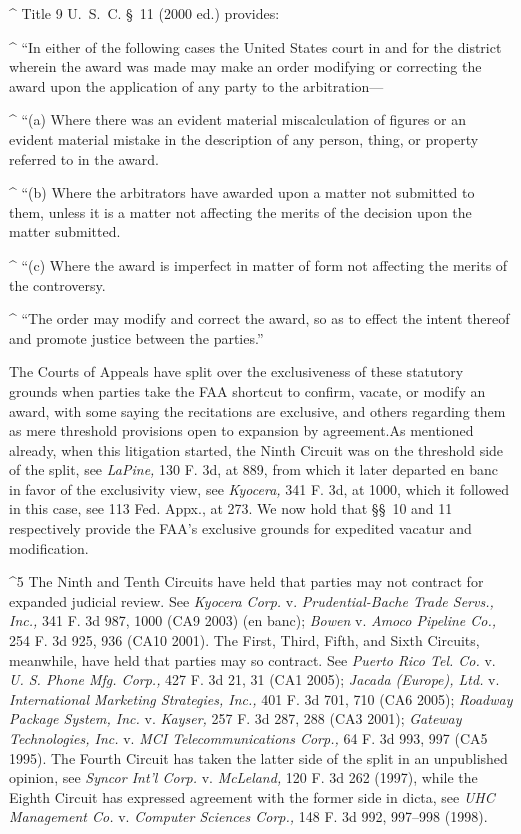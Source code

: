 ^   Title 9 U.~S.~C. \S~11 (2000 ed.) provides:

^   ``In either of the following cases the United States court in and
for the district wherein the award was made may make an order modifying
or correcting the award upon the application of any party to the
arbitration---

^   ``(a) Where there was an evident material miscalculation of figures
or an evident material mistake in the description of any person, thing,
or property referred to in the award.

^   ``(b) Where the arbitrators have awarded upon a matter not submitted
to them, unless it is a matter not affecting the merits of the decision
upon the matter submitted.

^   ``(c) Where the award is imperfect in matter of form not affecting
the merits of the controversy.

^   ``The order may modify and correct the award, so as to effect the
intent thereof and promote justice between the parties.''

  The Courts of Appeals have split over the exclusiveness of these
statutory grounds when parties take the FAA shortcut to confirm, vacate,
or modify an award, with some saying the recitations are exclusive, and
others regarding them as mere threshold provisions open to expansion
by agreement.\footnotemark[5] \newpage  As mentioned already, when this litigation
started, the Ninth Circuit was on the threshold side of the split, see
\emph{LaPine,} 130 F. 3d, at 889, from which it later departed en banc in
favor of the exclusivity view, see \emph{Kyocera,} 341 F. 3d, at 1000,
which it followed in this case, see 113 Fed. Appx., at 273. We now hold
that \S\S~10 and 11 respectively provide the FAA's exclusive grounds
for expedited vacatur and modification.

^5 The Ninth and Tenth Circuits have held that parties may not
contract for expanded judicial review. See \emph{Kyocera Corp.} v.
\emph{Prudential-Bache Trade Servs., Inc.,} 341 F. 3d 987, 1000 (CA9 2003)
(en banc); \emph{Bowen} v. \emph{Amoco Pipeline Co.,} 254 F. 3d 925, 936
(CA10 2001). The First, Third, Fifth, and Sixth Circuits, meanwhile,
have held that parties may so contract. See \emph{Puerto Rico Tel. Co.}
v. \emph{U. S. Phone Mfg. Corp.,} 427 F. 3d 21, 31 (CA1 2005); \emph{Jacada
(Europe), Ltd.} v. \emph{International Marketing Strategies, Inc.,} 401 F.
3d 701, 710 (CA6 2005); \emph{Roadway Package System, Inc.} v. \emph{Kayser,}
257 F. 3d 287, 288 (CA3 2001); \emph{Gateway Technologies, Inc.} v. \emph{MCI
Telecommunications Corp.,} 64 F. 3d 993, 997 (CA5 1995). The Fourth
Circuit has taken the latter side of the split in an unpublished \newpage 
opinion, see \emph{Syncor Int'l Corp.} v. \emph{McLeland,} 120 F. 3d
262 (1997), while the Eighth Circuit has expressed agreement with
the former side in dicta, see \emph{UHC Management Co.} v. \emph{Computer
Sciences Corp.,} 148 F. 3d 992, 997--998 (1998).

